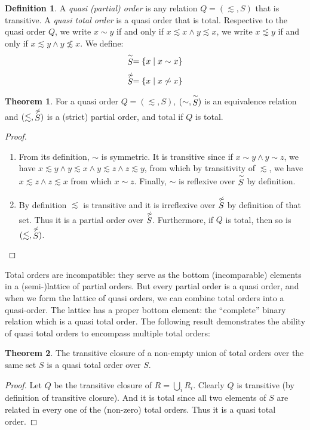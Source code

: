 \documentclass[12pt]{article}
\theoremstyle{definition}
\newtheorem{definition}{Definition}[section]
\theoremstyle{theorem}
\newtheorem{theorem}{Theorem}[section]
\def\aset#1{\left\{{#1}\right\}}
\begin{document}
\begin{definition}
  A \emph{quasi (partial) order} is any relation $Q=(\lesssim,S)$ that is transitive.
  A \emph{quasi total order} is a quasi order that is total.
  Respective to the quasi order $Q$, we write \( x \sim y \) if and only if \( x \lesssim x \wedge y \lesssim x \), we write \( x \lnsim y \) if and only if \( x \lesssim y \wedge y \not\lesssim x \).  We define:
  \[ \SimHat{S} = \aset{x \mid x \sim x} \]
  \[ \NotSimHat{S} = \aset{x \mid x \not\sim x } \]
\end{definition}
\begin{theorem}
  For a quasi order $Q=(\lesssim,S)$, \((\sim,\stackrel{\sim}{S})\) is an equivalence relation and 
  \((\lesssim,\stackrel{\not\sim}{S})\) is a (strict) partial order, and total
  if $Q$ is total.
\end{theorem}
\begin{proof}
  
  \verb| |
  
  \begin{enumerate}
    \item
      From its definition, $\sim$ is symmetric.  It is transitive since if
      \( x \sim y \wedge y \sim z \), we have \( x \lesssim y \wedge y
      \lesssim x \wedge y \lesssim z \wedge z \lesssim y \), from which
      by transitivity of $\lesssim$, we have \( x \lesssim z \wedge z
      \lesssim x \) from which \( x \sim z \).  Finally, $\sim$ is
      reflexive over \(\stackrel{\sim}{S}\) by definition.
    \item
      By definition $\lesssim$ is transitive and it is irreflexive over
      $\stackrel{\not\sim}{S}$ by definition of that set.  Thus it is a partial
      order over $\stackrel{\not\sim}{S}$.  Furthermore, if $Q$ is total, then
      so is \((\lesssim,\stackrel{\not\sim}{S})\).
  \end{enumerate}
\end{proof}

Total orders are incompatible: they serve as the bottom (incomparable)
elements in a (semi-)lattice of partial orders.  But every partial order is a
quasi order, and when we form the lattice of quasi orders, we can
combine total orders into a quasi-order.  The lattice has a proper
bottom element: the ``complete'' binary relation which is a quasi
total order.  The following result demonstrates the ability of quasi
total orders to encompass multiple total orders:

\begin{theorem}
  The transitive closure of a non-empty union of total orders over the
  same set $S$ is a
  quasi total order over $S$.
\end{theorem}
\begin{proof}
  Let \( Q \) be the transitive closure of \(R = \bigcup_i R_i\).  Clearly
  $Q$ is transitive (by definition of transitive closure).  And it is
  total since all two elements of $S$ are related in every one of the
  (non-zero) total orders.  Thus it is a quasi total order.
\end{proof}
\end{document}
